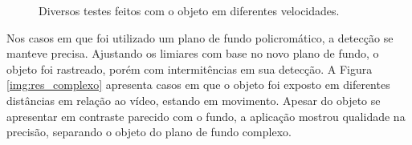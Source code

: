 \begin{figure}[H]
{		\label{img:res_basico_mov3}
	}
	\caption{Diversos testes feitos com o objeto em diferentes velocidades.}
	\label{img:res_basico_mov}
\end{figure}

Nos casos em que foi utilizado um plano de fundo policromático, a detecção se manteve precisa. Ajustando os limiares com base no novo plano de fundo, o objeto foi rastreado, porém com intermitências em sua detecção. A Figura \ref{img:res_complexo} apresenta casos em que o objeto foi exposto em diferentes distâncias em relação ao vídeo, estando em movimento. Apesar do objeto se apresentar em contraste parecido com o fundo, a aplicação mostrou qualidade na precisão, separando o objeto do plano de fundo complexo.

\begin{figure}[H]
	\centering
	\hspace{3em}
\end{figure}
